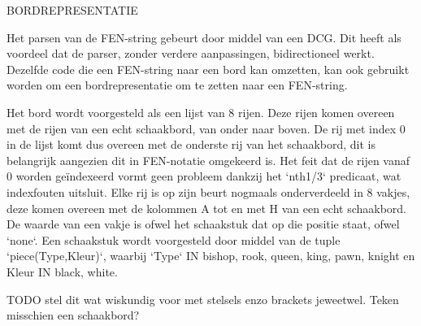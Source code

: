 BORDREPRESENTATIE

Het parsen van de FEN-string gebeurt door middel van een DCG. Dit heeft als voordeel dat de parser, zonder verdere aanpassingen, bidirectioneel werkt. Dezelfde code die een FEN-string naar een bord kan omzetten, kan ook gebruikt worden om een bordrepresentatie om te zetten naar een FEN-string.

Het bord wordt voorgesteld als een lijst van 8 rijen. Deze rijen komen overeen met de rijen van een echt schaakbord, van onder naar boven. De rij met index 0 in de lijst komt dus overeen met de onderste rij van het schaakbord, dit is belangrijk aangezien dit in FEN-notatie omgekeerd is. Het feit dat de rijen vanaf 0 worden ge\"indexeerd vormt geen probleem dankzij het `nth1/3` predicaat, wat indexfouten uitsluit. Elke rij is op zijn beurt nogmaals onderverdeeld in 8 vakjes, deze komen overeen met de kolommen A tot en met H van een echt schaakbord. De waarde van een vakje is ofwel het schaakstuk dat op die positie staat, ofwel `none`. Een schaakstuk wordt voorgesteld door middel van de tuple `piece(Type,Kleur)`, waarbij `Type` IN {bishop, rook, queen, king, pawn, knight} en Kleur IN {black, white}.

TODO stel dit wat wiskundig voor met stelsels enzo brackets jeweetwel. Teken misschien een schaakbord? 
